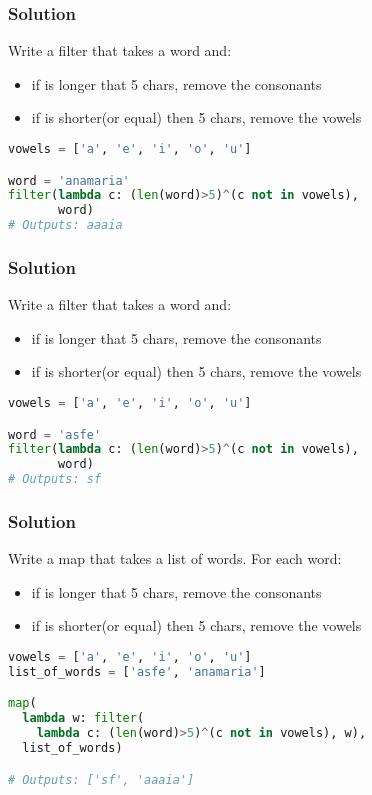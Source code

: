 \documentclass{beamer}
\begin{document}
\begin{frame}[fragile]
\frametitle{Solution}
Write a filter that takes a word and:\
\begin{itemize}
   \item if is longer that 5 chars, remove the consonants
   \item if is shorter(or equal) then 5 chars, remove the vowels
\end{itemize}

\begin{lstlisting}[language=python]
vowels = ['a', 'e', 'i', 'o', 'u']

word = 'anamaria'
filter(lambda c: (len(word)>5)^(c not in vowels),
       word)
# Outputs: aaaia

\end{lstlisting}
\end{frame}

\begin{frame}[fragile]
\frametitle{Solution}
Write a filter that takes a word and:\
\begin{itemize}
   \item if is longer that 5 chars, remove the consonants
   \item if is shorter(or equal) then 5 chars, remove the vowels
\end{itemize}

\begin{lstlisting}[language=python]
vowels = ['a', 'e', 'i', 'o', 'u']

word = 'asfe'
filter(lambda c: (len(word)>5)^(c not in vowels),
       word)
# Outputs: sf

\end{lstlisting}
\end{frame}

\begin{frame}[fragile]
\frametitle{Solution}
Write a map that takes a list of words. For each word:
\begin{itemize}
   \item if is longer that 5 chars, remove the consonants
   \item if is shorter(or equal) then 5 chars, remove the vowels
\end{itemize}
\begin{lstlisting}[language=python]
vowels = ['a', 'e', 'i', 'o', 'u']
list_of_words = ['asfe', 'anamaria']

map(
  lambda w: filter(
    lambda c: (len(word)>5)^(c not in vowels), w),
  list_of_words)

# Outputs: ['sf', 'aaaia']
\end{lstlisting}
\end{frame}
\end{document}
